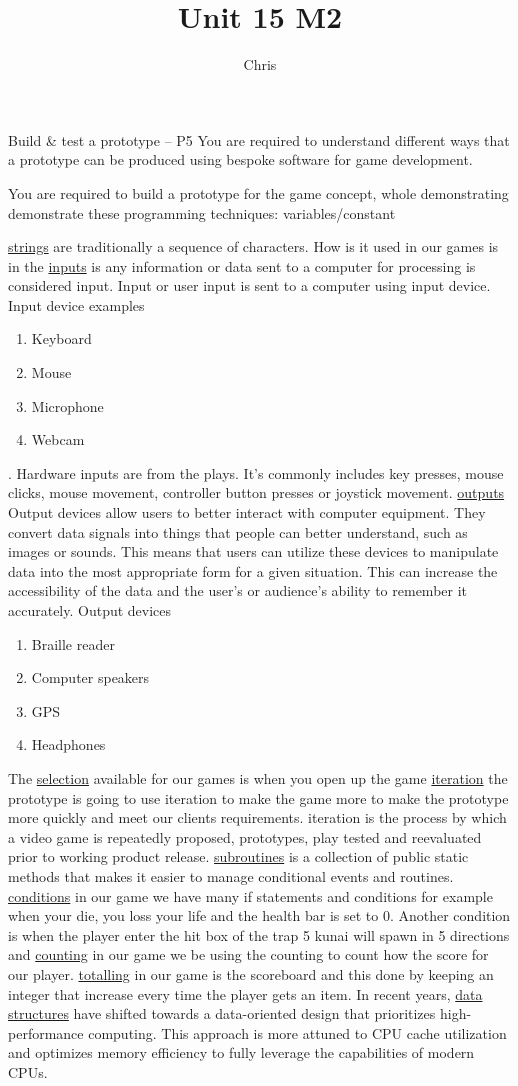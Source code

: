 \documentclass{article}
\title{Unit 15 M2}
\author{Chris}
\date{}
\begin{document}
 
Build \& test a prototype – P5
You are required to understand different ways that a prototype can be produced using bespoke
software for game development.

You are required to build a prototype for the game concept, whole demonstrating demonstrate
these programming techniques: variables/constant

\underline{strings} are traditionally a sequence of characters. How is it used in our games is in the 
\underline{inputs} is any information or data sent to a computer for processing is considered input. Input or user input is sent to a computer using input device. 
Input device examples
\begin{enumerate}
	\item Keyboard
	\item Mouse
	\item Microphone
	\item Webcam
\end{enumerate}
. Hardware inputs are from the plays. It's commonly includes key presses, mouse clicks, mouse movement, controller button presses or joystick movement.
\underline{outputs}
Output devices allow users to better interact with computer equipment. They convert data signals into things that people can better understand, such as images or sounds. This means that users can utilize these devices to manipulate data into the most appropriate form for a given situation. This can increase the accessibility of the data and the user's or audience's ability to remember it accurately.
Output devices
\begin{enumerate}
	\item Braille reader
	\item Computer speakers
	\item GPS
	\item Headphones
\end{enumerate}
The \underline{selection} available for our games is when you open up the game 
\underline{iteration} the prototype is going to use iteration to make the game more to make the prototype more quickly and meet our clients requirements. iteration is the process by which a video game is repeatedly proposed, prototypes, play tested and reevaluated prior to working product release.
\underline{subroutines} is a collection of public static methods that makes it easier to manage conditional events and routines. 
\underline{conditions} in our game we have many if statements and conditions for example when your die, you loss your life and the health bar is set to 0. Another condition is when the player enter the hit box of the trap 5 kunai will spawn in 5 directions and 
\underline{counting} in our game we be using the counting to count how the score for our player.
\underline{totalling} in our game is the scoreboard and this done by keeping an integer that increase every time the player gets an item. 
In recent years, \underline{data structures} have shifted towards a data-oriented design that prioritizes high-performance computing. This approach is more attuned to CPU cache utilization and optimizes memory efficiency to fully leverage the capabilities of modern CPUs.
\end{document}
